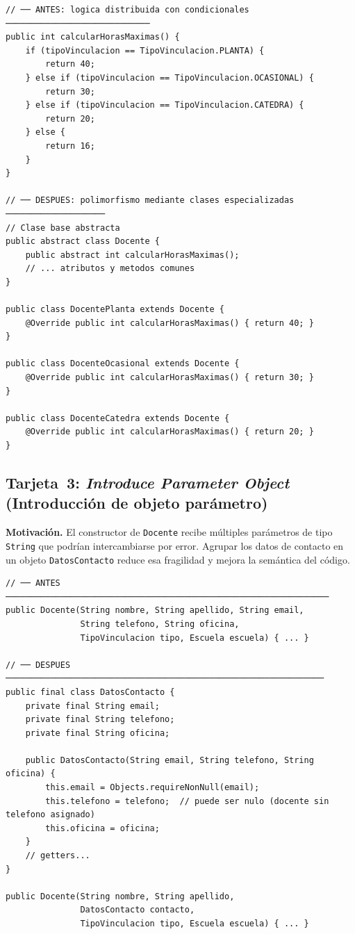 \begin{lstlisting}[style=javaStyle,
  caption={\textit{Replace Conditional with Polymorphism} en \java: antes y después.},
  label={lst:refact-poly-java}]
// ── ANTES: logica distribuida con condicionales ─────────────────────────────
public int calcularHorasMaximas() {
    if (tipoVinculacion == TipoVinculacion.PLANTA) {
        return 40;
    } else if (tipoVinculacion == TipoVinculacion.OCASIONAL) {
        return 30;
    } else if (tipoVinculacion == TipoVinculacion.CATEDRA) {
        return 20;
    } else {
        return 16;
    }
}

// ── DESPUES: polimorfismo mediante clases especializadas ────────────────────
// Clase base abstracta
public abstract class Docente {
    public abstract int calcularHorasMaximas();
    // ... atributos y metodos comunes
}

public class DocentePlanta extends Docente {
    @Override public int calcularHorasMaximas() { return 40; }
}

public class DocenteOcasional extends Docente {
    @Override public int calcularHorasMaximas() { return 30; }
}

public class DocenteCatedra extends Docente {
    @Override public int calcularHorasMaximas() { return 20; }
}
\end{lstlisting}

\subsection{Tarjeta~3: \textit{Introduce Parameter Object} (Introducción de objeto parámetro)}
\label{subsec:refact-param-object}

\textbf{Motivación.} El constructor de \texttt{Docente} recibe múltiples parámetros
de tipo \texttt{String} que podrían intercambiarse por error. Agrupar los datos de
contacto en un objeto \texttt{DatosContacto} reduce esa fragilidad y mejora la
semántica del código.

\begin{lstlisting}[style=javaStyle,
  caption={\textit{Introduce Parameter Object} en \java: creación de \texttt{DatosContacto}.},
  label={lst:refact-param-obj-java}]
// ── ANTES ─────────────────────────────────────────────────────────────────
public Docente(String nombre, String apellido, String email,
               String telefono, String oficina,
               TipoVinculacion tipo, Escuela escuela) { ... }

// ── DESPUES ────────────────────────────────────────────────────────────────
public final class DatosContacto {
    private final String email;
    private final String telefono;
    private final String oficina;

    public DatosContacto(String email, String telefono, String oficina) {
        this.email = Objects.requireNonNull(email);
        this.telefono = telefono;  // puede ser nulo (docente sin telefono asignado)
        this.oficina = oficina;
    }
    // getters...
}

public Docente(String nombre, String apellido,
               DatosContacto contacto,
               TipoVinculacion tipo, Escuela escuela) { ... }
\end{lstlisting}

